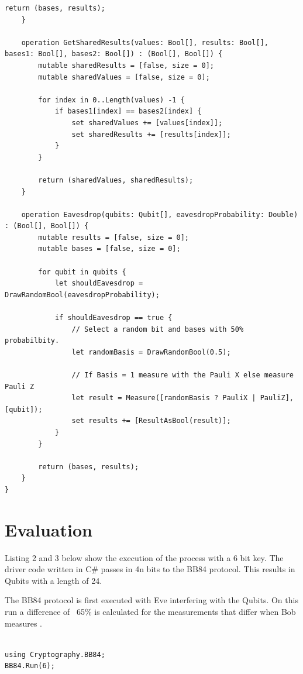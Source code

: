 \documentclass{article}
\begin{document}
\begin{lstlisting}[language={[Sharp]C}, caption={Q\# Microsoft Quantum Development Kit}, label={Script}]
        return (bases, results);
    }

    operation GetSharedResults(values: Bool[], results: Bool[], bases1: Bool[], bases2: Bool[]) : (Bool[], Bool[]) {
        mutable sharedResults = [false, size = 0];
        mutable sharedValues = [false, size = 0];

        for index in 0..Length(values) -1 {
            if bases1[index] == bases2[index] {
                set sharedValues += [values[index]];
                set sharedResults += [results[index]];
            }
        }

        return (sharedValues, sharedResults);
    }

    operation Eavesdrop(qubits: Qubit[], eavesdropProbability: Double) : (Bool[], Bool[]) {
        mutable results = [false, size = 0];
        mutable bases = [false, size = 0];

        for qubit in qubits {
            let shouldEavesdrop = DrawRandomBool(eavesdropProbability);

            if shouldEavesdrop == true {
                // Select a random bit and bases with 50% probabilbity.
                let randomBasis = DrawRandomBool(0.5);

                // If Basis = 1 measure with the Pauli X else measure Pauli Z
                let result = Measure([randomBasis ? PauliX | PauliZ], [qubit]);
                set results += [ResultAsBool(result)];
            }
		}

        return (bases, results);
    }
}

\end{lstlisting}

\section{Evaluation}

Listing 2 and 3 below show the execution of the process with a 6 bit key. The driver code written in C\# passes in 4n bits to the BB84 protocol. This results in Qubits with a length of 24.

The BB84 protocol is first  executed with Eve interfering with the Qubits. On this run a difference of  ~65\% is calculated for the measurements that differ when Bob measures .

\begin{lstlisting}[language={[Sharp]C}, caption={C\# Driver code executes process with a 6 bit key}, label={Script}]

using Cryptography.BB84;
BB84.Run(6);

\end{lstlisting}
\end{document}
